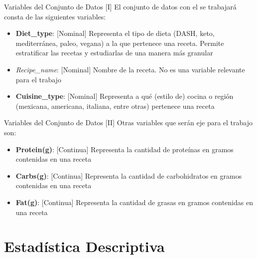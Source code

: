 \documentclass{beamer}
\begin{document}
    \begin{frame}{Variables del Conjunto de Datos [I]}
        El conjunto de datos con el se trabajará consta de 
        las siguientes variables:
        \begin{itemize}
            \item<2->\textbf{Diet\_type}: [Nominal] Representa 
            el tipo de dieta (DASH, keto, mediterránea, paleo, vegana) 
            a la que pertenece una receta. Permite estratificar las recetas 
            y estudiarlas de una manera más granular
            \item<3->\emph{Recipe\_name}: [Nominal] Nombre de 
            la receta. No es una variable relevante para el trabajo
            \item<4->\textbf{Cuisine\_type}: [Nominal] Representa 
            a qué (estilo de) cocina o región (mexicana, americana, 
            italiana, entre otras) pertenece una receta
        \end{itemize}
    \end{frame}

    \begin{frame}{Variables del Conjunto de Datos [II]}
        Otras variables que serán eje para el trabajo son:
        \begin{itemize}
            \item<1->\textbf{Protein(g)}: [Continua] Representa la 
            cantidad de proteínas en gramos contenidas en una receta
            \item<2->\textbf{Carbs(g)}: [Continua] Representa la 
            cantidad de carbohidratos en gramos contenidas en una receta
            \item<3->\textbf{Fat(g)}: [Continua] Representa la 
            cantidad de grasas en gramos contenidas en una receta
        \end{itemize}
    \end{frame}

    \section{Estadística Descriptiva}
\end{document}
